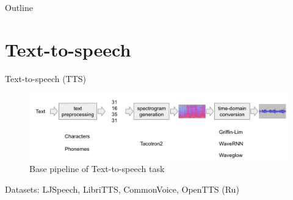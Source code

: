 
\usepackage{tikz}
\usetikzlibrary{arrows,shapes,positioning,shadows,trees}

\begin{frame}
\titlepage
\end{frame}
\begin{frame}{Outline}
	\tableofcontents
\end{frame}

\section{Text-to-speech}
\begin{frame}{Text-to-speech (TTS)}
    \begin{figure}
    	\centering
    	\includegraphics[width=0.99\linewidth]{figs/tts_pipeline.png}
    	\caption{Base pipeline of Text-to-speech task}
    \end{figure}
    
    Datasets: LJSpeech, LibriTTS, CommonVoice, OpenTTS (Ru)
    

\end{frame}
